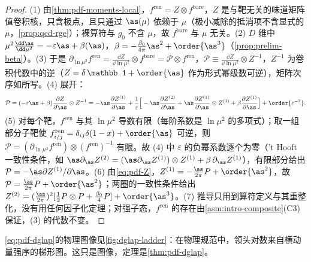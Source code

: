 \begin{proof}
(1) 由\cref{thm:pdf-moments-local}，$f^{\mathrm{ren}}=Z\otimes f^{\mathrm{bare}}$，$Z$ 是与靶无关的味道矩阵值卷积核，只含极点，且只通过 $\as(\mu)$ 依赖于 $\mu$（极小减除的抵消项不含显式的 $\mu$，\cref{prop:qcd-rge}）；裸算符与 $g_0$ 不含 $\mu$，故 $f^{\mathrm{bare}}$ 与 $\mu$ 无关。(2) $D$ 维中 $\mu^2\frac{\dd\as}{\dd\mu^2}=-\varepsilon\as+\beta(\as)$，$\beta=-\frac{\beta_0}{4\pi}\as^2+\order{\as^3}$（\cref{prop:prelim-beta}）。(3) 于是 $\partial_{\ln\mu^2}f^{\mathrm{ren}}=\frac{\dd Z}{\dd\ln\mu^2}\otimes f^{\mathrm{bare}}=\mathcal P\otimes f^{\mathrm{ren}}$，$\mathcal P\equiv\frac{\dd Z}{\dd\ln\mu^2}\otimes Z^{-1}$，$Z^{-1}$ 为卷积代数中的逆（$Z=\delta\,\mathbb 1+\order{\as}$ 作为形式幂级数可逆），矩阵次序如所写。(4) 展开：
\[
\mathcal P=(-\varepsilon\as+\beta)\frac{\partial Z}{\partial\as}\otimes Z^{-1}
=-\as\frac{\partial Z^{(1)}}{\partial\as}+\frac1\varepsilon\Big[-\as\frac{\partial Z^{(2)}}{\partial\as}+\as\frac{\partial Z^{(1)}}{\partial\as}\otimes Z^{(1)}+\beta\frac{\partial Z^{(1)}}{\partial\as}\Big]+\order{\varepsilon^{-2}}.
\]
(5) 对每个靶，$f^{\mathrm{ren}}$ 与其 $\ln\mu^2$ 导数有限（每阶系数是 $\ln\mu^2$ 的多项式）；取一组部分子靶使 $f^{\mathrm{ren}}_{i/j}=\delta_{ij}\delta(1-x)+\order{\as}$ 可逆，则 $\mathcal P=(\partial_{\ln\mu^2}f^{\mathrm{ren}})\otimes(f^{\mathrm{ren}})^{-1}$ 有限。故 (4) 中 $\varepsilon$ 的负幂系数逐个为零（'t Hooft 一致性条件，如 $\as\partial_{\as}Z^{(2)}=(\as\partial_{\as}Z^{(1)})\otimes Z^{(1)}+\beta\,\partial_{\as}Z^{(1)}$），有限部分给出 $\mathcal P=-\as\partial Z^{(1)}/\partial\as$。(6) 由\cref{eq:pdf-Z}，$Z^{(1)}=-\frac{\as}{2\pi}P+\order{\as^2}$，故 $\mathcal P=\frac{\as}{2\pi}P+\order{\as^2}$；两圈的一致性条件给出 $Z^{(2)}=(\frac{\as}{2\pi})^2[\frac12P\otimes P+\frac{\beta_0}4P]+\order{\as^3}$。(7) 推导只用到算符定义与其重整化，没有用任何因子化定理；对强子态，$f^{\mathrm{ren}}$ 的存在由\cref{asm:intro-composite}(C3) 保证，(3) 的代数不变。
\end{proof}

\cref{eq:pdf-dglap}的物理图像见\cref{fig:dglap-ladder}：在物理规范中，领头对数来自横动量强序的梯形图。这只是图像，定理是\cref{thm:pdf-dglap}。

